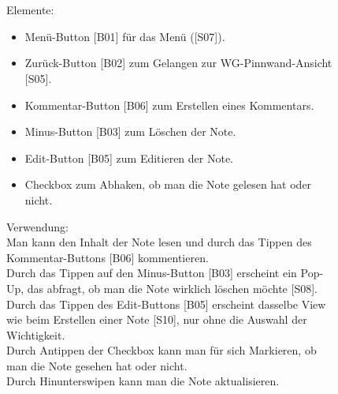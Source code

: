 \documentclass[a4paper]{scrreprt}
\begin{document}
\begin{figure}[h]
\begin{minipage}[b]{0.55\linewidth}
    			\\
    			\hfill
    			\\Elemente:\\
    			\begin{itemize}
    				\renewcommand\labelitemi{--}
    				\item  Menü-Button {[}B01{]} für das Menü ({[}S07{]}).
    				\item Zurück-Button {[}B02{]} zum Gelangen zur
    				WG-Pinnwand-Ansicht {[}S05{]}.
    				\item Kommentar-Button {[}B06{]} zum Erstellen eines
    				Kommentars.
    				\item Minus-Button {[}B03{]} zum Löschen der Note.
    				\item Edit-Button {[}B05{]} zum Editieren der Note.
    				\item Checkbox zum Abhaken, ob man die Note gelesen hat oder nicht.
    				
    			\end{itemize}
    			
    			\hfill
    			
    			Verwendung:\\
    			Man kann den Inhalt der Note lesen und durch
    			das Tippen des Kommentar-Buttons {[}B06{]}
    			kommentieren. \\
    			Durch das Tippen auf den 
    			Minus-Button {[}B03{]} erscheint ein Pop-Up, das abfragt, ob man die Note wirklich löschen möchte {[}S08{]}.\\
    			Durch das Tippen des Edit-Buttons {[}B05{]} erscheint
    			dasselbe View wie beim Erstellen einer Note {[}S10{]}, nur ohne die Auswahl der Wichtigkeit.\\ Durch Antippen der Checkbox kann man für sich Markieren, ob man die Note gesehen hat oder nicht.\\
    			Durch Hinunterswipen kann man die Note aktualisieren.
    			
    		\end{minipage}
    	\end{figure}
    	
    	\clearpage
    	
\end{document}
